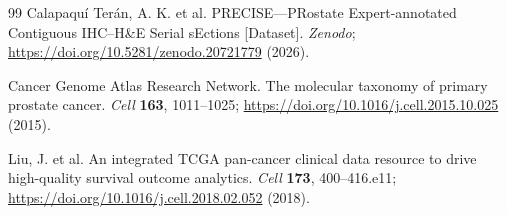 \begin{thebibliography}{99}
 Calapaqu\'i Ter\'an, A. K. et al. PRECISE---PRostate
Expert-annotated Contiguous IHC--H\&E Serial sEctions [Dataset]. \textit{Zenodo};
\url{https://doi.org/10.5281/zenodo.20721779} (2026).

 Cancer Genome Atlas Research Network. The molecular taxonomy
of primary prostate cancer. \textit{Cell} \textbf{163}, 1011--1025;
\url{https://doi.org/10.1016/j.cell.2015.10.025} (2015).

 Liu, J. et al. An integrated TCGA pan-cancer clinical data
resource to drive high-quality survival outcome analytics. \textit{Cell} \textbf{173},
400--416.e11; \url{https://doi.org/10.1016/j.cell.2018.02.052} (2018).

\end{thebibliography}
